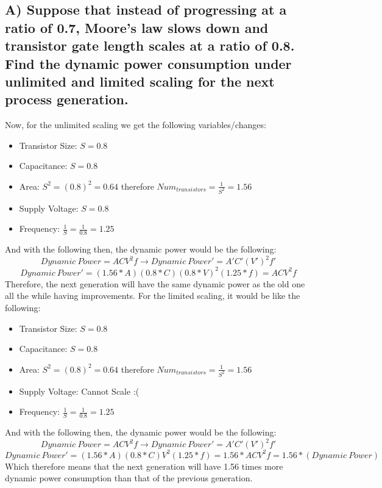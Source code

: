 \documentclass{article}
\begin{document}
\subsection{A) Suppose that instead of progressing at a ratio of 0.7, Moore’s law slows down and transistor gate length scales at a ratio of 0.8. Find the dynamic power consumption under unlimited and limited scaling for the next process generation.}
Now, for the unlimited scaling we get the following variables/changes:
\begin{itemize}
  \item Transistor Size: $S = 0.8$
  \item Capacitance: $S = 0.8$
  \item Area: $S^2 = (0.8)^2 = 0.64$ therefore $Num_{transistors} = \frac{1}{S^2} = 1.56$
  \item Supply Voltage: $S = 0.8$
  \item Frequency: $\frac{1}{S} = \frac{1}{0.8} = 1.25$
\end{itemize}
And with the following then, the dynamic power would be the following:
$$ Dynamic\ Power = ACV^2f \rightarrow Dynamic\ Power' = A'C'(V')^2f' $$
$$ Dynamic\ Power' = (1.56*A)(0.8*C)(0.8*V)^2(1.25*f) = ACV^2f $$
Therefore, the next generation will have the same dynamic power as the old one all the while having improvements. For the limited scaling, it would be like the following:
\begin{itemize}
  \item Transistor Size: $S = 0.8$
  \item Capacitance: $S = 0.8$
  \item Area: $S^2 = (0.8)^2 = 0.64$ therefore $Num_{transistors} = \frac{1}{S^2} = 1.56$
  \item Supply Voltage: Cannot Scale :(
  \item Frequency: $\frac{1}{S} = \frac{1}{0.8} = 1.25$
\end{itemize}
And with the following then, the dynamic power would be the following:
$$ Dynamic\ Power = ACV^2f \rightarrow Dynamic\ Power' = A'C'(V')^2f' $$
$$ Dynamic\ Power' = (1.56*A)(0.8*C)V^2(1.25*f) = 1.56*ACV^2f = 1.56*(Dynamic\ Power) $$
Which therefore means that the next generation will have 1.56 times more dynamic power consumption than that of the previous generation.
\end{document}
